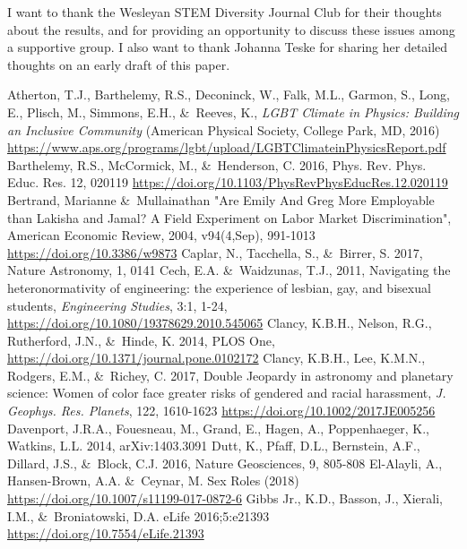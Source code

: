 \documentclass[modern]{aastex62}
\begin{document}
\acknowledgements
I want to thank the Wesleyan STEM Diversity Journal Club for their thoughts about the results, and for providing an opportunity to discuss these issues among a supportive group. I also want to thank Johanna Teske for sharing her detailed thoughts on an early draft of this paper. 

\begin{thebibliography}{}
 Atherton, T.J., Barthelemy, R.S., Deconinck, W., Falk, M.L., Garmon, S., Long, E., Plisch, M., Simmons, E.H., \&\ Reeves, K., {\it LGBT Climate in Physics: Building an Inclusive Community} (American Physical Society, College Park, MD, 2016) \url{https://www.aps.org/programs/lgbt/upload/LGBTClimateinPhysicsReport.pdf}
 Barthelemy, R.S., McCormick, M., \&\ Henderson, C. 2016, Phys. Rev. Phys. Educ. Res. 12, 020119 \url{https://doi.org/10.1103/PhysRevPhysEducRes.12.020119}
 Bertrand, Marianne \&\ Mullainathan "Are Emily And Greg More Employable than Lakisha and Jamal? A Field Experiment on Labor Market Discrimination", American Economic Review, 2004, v94(4,Sep), 991-1013 \url{https://doi.org/10.3386/w9873}
 Caplar, N., Tacchella, S., \&\ Birrer, S. 2017, Nature Astronomy, 1, 0141
 Cech, E.A. \&\ Waidzunas, T.J., 2011, Navigating the heteronormativity of engineering: the experience of lesbian, gay, and bisexual students, {\it Engineering Studies}, 3:1, 1-24, \url{https://doi.org/10.1080/19378629.2010.545065}
 Clancy, K.B.H., Nelson, R.G., Rutherford, J.N., \&\ Hinde, K. 2014, PLOS One, \url{https://doi.org/10.1371/journal.pone.0102172}
 Clancy, K.B.H., Lee, K.M.N., Rodgers, E.M., \&\ Richey, C. 2017, Double Jeopardy in astronomy and planetary science: Women of color face greater risks of gendered and racial harassment, {\it J. Geophys. Res. Planets}, 122, 1610-1623 \url{https://doi.org/10.1002/2017JE005256}
 Davenport, J.R.A., Fouesneau, M., Grand, E., Hagen, A., Poppenhaeger, K., Watkins, L.L. 2014, arXiv:1403.3091
 Dutt, K., Pfaff, D.L., Bernstein, A.F., Dillard, J.S., \&\ Block, C.J. 2016, Nature Geosciences, 9, 805-808 
 El-Alayli, A., Hansen-Brown, A.A. \&\ Ceynar, M. Sex Roles (2018) \url{https://doi.org/10.1007/s11199-017-0872-6}
 Gibbs Jr., K.D., Basson, J., Xierali, I.M., \&\ Broniatowski, D.A. eLife 2016;5:e21393 \url{https://doi.org/10.7554/eLife.21393}

\end{thebibliography}
\end{document}
